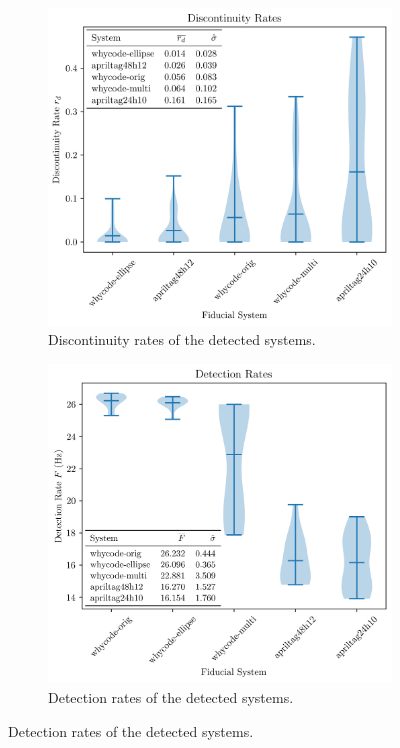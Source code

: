 \begin{figure}
    \centering
        \begin{subfigure}[b]{0.48\textwidth}
        \centering
        \includegraphics[width=\textwidth]{images/violin_plot_five_member}
        \caption{Discontinuity rates of the detected systems.}
        \label{figure:discontinuity_rates}
    \end{subfigure}
    \begin{subfigure}[b]{0.48\textwidth}
        \centering
        \includegraphics[width=\textwidth]{images/violin_plot_speed_five_member}
        \caption{Detection rates of the detected systems.}
        \label{figure:detection_rates}
    \end{subfigure}
\end{figure}